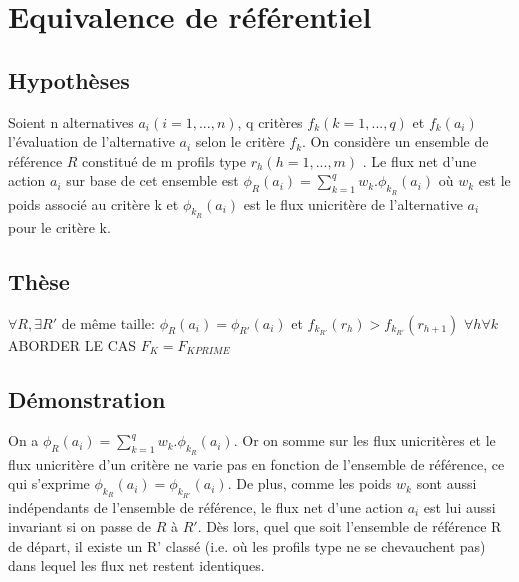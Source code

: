 \documentclass{article}
\begin{document}
\section{Equivalence de référentiel}

\subsection{Hypothèses}\justify
Soient n alternatives $a_i (i=1,...,n)$, q critères $f_k (k=1,...,q)$ et $f_k(a_i)$ l'évaluation de l'alternative $a_i$ selon le critère $f_k$. On considère un ensemble de référence $R$ constitué de m profils type $r_h (h=1,...,m)$ . Le flux net d'une action $a_i$ sur base de cet ensemble est $\phi_R(a_i)=\sum\limits_{k=1}^q w_k.\phi_{k_R}(a_i)$ où $w_k$ est le poids associé au critère k et $\phi_{k_R}(a_i)$ est le flux unicritère de l'alternative $a_i$ pour le critère k.

\subsection{Thèse}\justify
$\forall R, \exists R'$ de même taille: $\phi_R(a_i)=\phi_{R'}(a_i)$ et $f_{k_{R'}}(r_h)>f_{k_{R'}}(r_{h+1})$ $\forall h \forall k$\\

ABORDER LE CAS $F_K=F_{KPRIME}$

\subsection{Démonstration}
On a $\phi_R(a_i)=\sum\limits_{k=1}^q w_k.\phi_{k_R}(a_i)$. Or on somme sur les flux unicritères et le flux unicritère d'un critère ne varie pas en fonction de l'ensemble de référence, ce qui s'exprime $\phi_{k_R}(a_i)=\phi_{k_{R'}}(a_i)$. De plus, comme les poids $w_k$ sont aussi indépendants de l'ensemble de référence, le flux net d'une action $a_i$ est lui aussi invariant si on passe de $R$ à $R'$.
Dès lors, quel que soit l'ensemble de référence R de départ, il existe un R' classé (i.e. où les profils type ne se chevauchent pas) dans lequel les flux net restent identiques.
\end{document}
